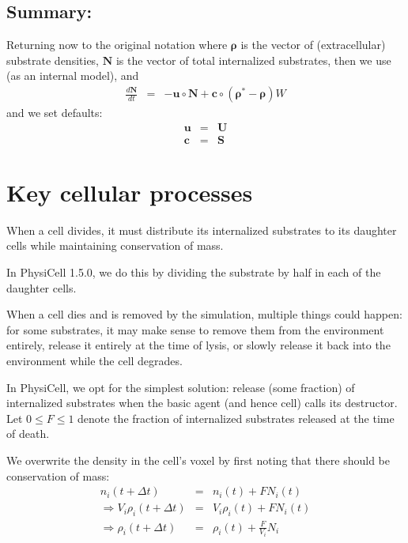 \documentclass[11point]{article}
\newcommand{\beq}{\begin{eqnarray}}
\newcommand{\eeq}{\end{eqnarray}}
\renewcommand{\vec}[1]{\bm{#1}}
\begin{document}
\subsection{Summary:}
Returning now to the original notation where $\vec{\rho}$ is the vector of (extracellular) substrate densities, $\vec{N}$ is the vector of total internalized 
substrates, then we use (as an internal model), and 
\beq
\frac{d\vec{N}}{dt} & = & 
- \vec{u}\circ \vec{N} + \vec{c} \circ \left( \vec{\rho}^* - \vec{\rho}  \right)W
\eeq
and we set defaults: 
\beq
\vec{u} & = & \vec{U} \\
\vec{c} & = & \vec{S} 
\eeq

\section{Key cellular processes}
When a cell divides, it must distribute its internalized substrates to its daughter cells while maintaining conservation of mass. 

In PhysiCell 1.5.0, we do this by dividing the substrate by half in each of the daughter cells. 

When a cell dies and is removed by the simulation, multiple things could happen: for some substrates, it may make sense to 
remove them from the environment entirely, release it entirely at the time of lysis, or slowly release it back into the environment 
while the cell degrades. 

In PhysiCell, we opt for the simplest solution: release (some fraction) of internalized substrates when the basic agent (and hence cell) calls 
its destructor. Let $0 \le F \le 1$ denote the fraction of internalized 
substrates released at the time of death. 

We overwrite the density in the cell's voxel by first noting that there should be conservation of mass: 
\beq
n_i( t + \Delta t ) & = & 
n_i( t ) + F N_i (t)  \\ 
\Longrightarrow 
V_i \rho_i(t + \Delta t) & = &
V_i \rho_i(t) + F N_i(t) \\ 
\Longrightarrow 
\rho_i( t + \Delta t ) & = & 
\rho_i(t) + \frac{F}{V_i} N_i 
\eeq
\end{document}
